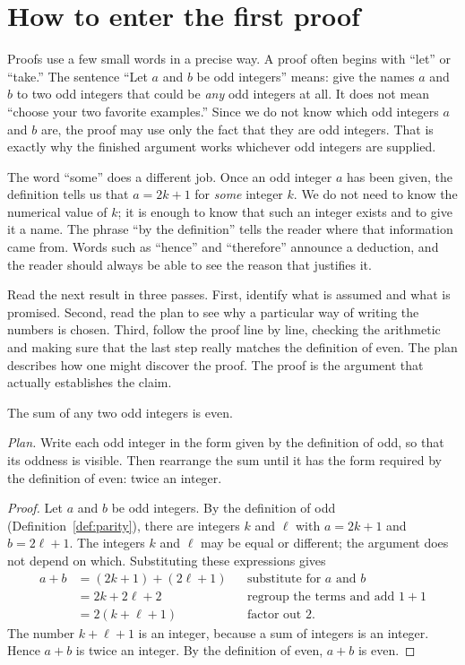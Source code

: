 \section{How to enter the first proof}\label{ch01:sec:first-proof}
Proofs use a few small words in a precise way. A proof often begins with ``let'' or ``take.'' The sentence ``Let $a$ and $b$ be odd integers'' means: give the names $a$ and $b$ to two odd integers that could be \emph{any} odd integers at all. It does not mean ``choose your two favorite examples.'' Since we do not know which odd integers $a$ and $b$ are, the proof may use only the fact that they are odd integers. That is exactly why the finished argument works whichever odd integers are supplied.

The word ``some'' does a different job. Once an odd integer $a$ has been given, the definition tells us that $a=2k+1$ for \emph{some} integer $k$. We do not need to know the numerical value of $k$; it is enough to know that such an integer exists and to give it a name. The phrase ``by the definition'' tells the reader where that information came from. Words such as ``hence'' and ``therefore'' announce a deduction, and the reader should always be able to see the reason that justifies it.

Read the next result in three passes. First, identify what is assumed and what is promised. Second, read the plan to see why a particular way of writing the numbers is chosen. Third, follow the proof line by line, checking the arithmetic and making sure that the last step really matches the definition of even. The plan describes how one might discover the proof. The proof is the argument that actually establishes the claim.

\par\noindent\begin{minipage}{\linewidth}
\begin{proposition}\label{thm:odd-sum}
The sum of any two odd integers is even.
\end{proposition}
\end{minipage}\par

\noindent\textit{Plan.} Write each odd integer in the form given by the definition of odd, so that its oddness is visible. Then rearrange the sum until it has the form required by the definition of even: twice an integer.
\begin{proof}
Let $a$ and $b$ be odd integers. By the definition of odd (Definition~\ref{def:parity}), there are integers $k$ and $\ell$ with $a=2k+1$ and $b=2\ell+1$. The integers $k$ and $\ell$ may be equal or different; the argument does not depend on which. Substituting these expressions gives
\begin{align*}
a+b&=(2k+1)+(2\ell+1) &&\text{substitute for $a$ and $b$}\\
&=2k+2\ell+2 &&\text{regroup the terms and add $1+1$}\\
&=2(k+\ell+1) &&\text{factor out $2$.}
\end{align*}
The number $k+\ell+1$ is an integer, because a sum of integers is an integer. Hence $a+b$ is twice an integer. By the definition of even, $a+b$ is even.
\end{proof}

